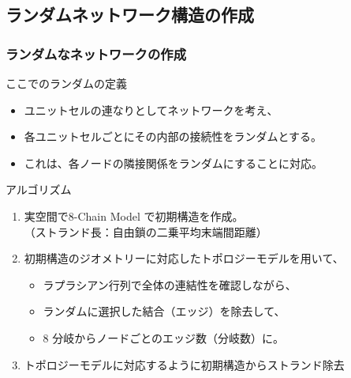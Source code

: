 \documentclass[11pt, dvipdfmx]{beamer}
\begin{document}
\subsection{ランダムネットワーク構造の作成}
\begin{frame}
\frametitle{ランダムなネットワークの作成}
\small
\vspace{-2mm}
\begin{block}{ここでのランダムの定義}
\begin{itemize}
\item
ユニットセルの連なりとしてネットワークを考え、
\item
各ユニットセルごとにその内部の接続性をランダムとする。
\item
これは、\alert{各ノードの隣接関係をランダム}にすることに対応。
\end{itemize}
\end{block}
\vspace{-2mm}
\begin{exampleblock}{アルゴリズム}
\begin{enumerate}
\item
\alert{実空間}で8-Chain Model で初期構造を作成。\\（ストランド長：自由鎖の二乗平均末端間距離）
\item
初期構造のジオメトリーに対応した\alert{トポロジーモデル}を用いて、
	\begin{itemize}
 	\item 
 	ラプラシアン行列で\alert{全体の連結性を確認}しながら、
 	\item
 	\alert{ランダム}に選択した\alert{結合（エッジ）を除去}して、
 	\item
	8 分岐からノードごとのエッジ数（分岐数）に。
	\end{itemize}	
\item
トポロジーモデルに対応するように初期構造からストランド除去
\end{enumerate}
\end{exampleblock}
\end{frame}
\end{document}

